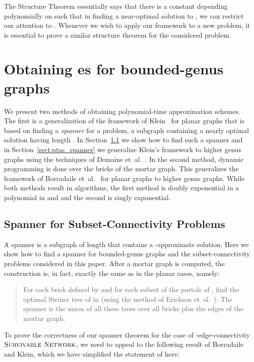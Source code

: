 \documentclass{article}
\newcommand{\myproblemname}[1]{\ensuremath{\mbox{\sc #1}}\xspace}
\newcommand{\survive}{\myproblemname{Survivable Network}}
\begin{document}
The Structure Theorem essentially says that there is a constant
 depending polynomially on  such that in
finding a near-optimal solution to , we can restrict our attention
to . Whenever we wish to apply our framework to a
new problem, it is essential to prove a similar structure theorem for
the considered problem.

\section{Obtaining es for bounded-genus graphs}

We present two methods of obtaining polynomial-time approximation
schemes.  The first is a generalization of the framework of
Klein~\cite{Klein06} for planar graphs that is based on finding a
\emph{spanner} for a problem, a subgraph containing a nearly optimal
solution having length .  In Section~\ref{sec:spanner} we
show how to find such a spanner and in Section~\ref{sect:ptas_spanner}
we generalize Klein's framework to higher genus graphs using the
techniques of Demaine et~al.~\cite{DemaineHM07}.  In the second
method, dynamic programming is done over the bricks of the mortar
graph.  This generalizes the framework of Borradaile
et~al.~\cite{BorradaileKM09} for planar graphs to higher genus
graphs.  While both methods result in  algorithms, the
first method is doubly exponential in a polynomial in  and
 and the second is singly exponential.

\subsection{Spanner for Subset-Connectivity Problems}\label{sec:spanner}

A spanner is a subgraph of length
 that contains a -approximate
solution.  Here we show how to find a spanner for bounded-genus graphs
and the subset-connectivity problems considered in this paper. After a
mortar graph is computed, the construction is, in fact, exactly the
same as in the planar cases, namely:
\begin{quote}
  For each brick  defined by  and for each subset  of the
  portals of , find the optimal Steiner tree of  in  (using
  the method of Erickson et~al.~\cite{EricksonMV87}).  The spanner  is
  the union of all these trees over all bricks plus the edges of the
  mortar graph.
\end{quote}
To prove the correctness of our spanner theorem for the case of
-edge-connectivity \survive, we need to appeal to the
following result of Borradaile and Klein, which we have simplified the
statement of here:
\end{document}
